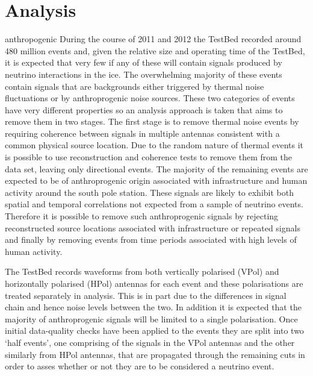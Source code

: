 \chapter{Analysis}
\label{chap:Analysis}

anthropogenic
During the course of 2011 and 2012 the TestBed recorded around 480 million events and, given the relative size and operating time of the TestBed, it is expected that very few if any of these will contain signals produced by neutrino interactions in the ice. The overwhelming majority of these events contain signals that are backgrounds either triggered by thermal noise fluctuations or by anthroprogenic noise sources. These two categories of events have very different properties so an analysis approach is taken that aims to remove them in two stages. The first stage is to remove thermal noise events by requiring coherence between signals in multiple antennas consistent with a common physical source location. Due to the random nature of thermal events it is possible to use reconstruction and coherence tests to remove them from the data set, leaving only directional events. The majority of the remaining events are expected to be of anthroprogenic origin associated with infrastructure and human activity around the south pole station. These signals are likely to exhibit both spatial and temporal correlations not expected from a sample of neutrino events. Therefore it is possible to remove such anthroprogenic signals by rejecting reconstructed source locations associated with infrastructure or repeated signals and finally by removing events from time periods associated with high levels of human activity.

The TestBed records waveforms from both vertically polarised (VPol) and horizontally polarised (HPol) antennas for each event and these polarisations are treated separately in analysis. This is in part due to the differences in signal chain and hence noise levels between the two. In addition it is expected that the majority of anthroprogenic signals will be limited to a single polarisation. Once initial data-quality checks have been applied to the events they are split into two `half events', one comprising of the signals in the VPol antennas and the other similarly from HPol antennas, that are propagated through the remaining cuts in order to asses whether or not they are to be considered a neutrino event.


